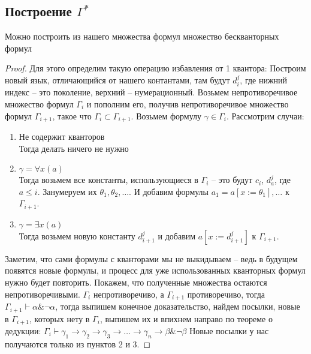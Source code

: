 \subsection{Построение \texorpdfstring{$\Gamma ^ *$}{Г*}}
\label{sec-8-5}
\begin{theorem}
Можно построить из нашего множества формул множество бескванторных формул
\end{theorem}
\begin{proof}
Для этого определим такую операцию избавления от 1 квантора: Построим новый язык, отличающийся от нашего контантами, там будут $d_i^j$, где нижний индекс -- это поколение, верхний – нумерационный. Возьмем непротиворечивое множество формул $\Gamma_i$ и пополним его, получив непротиворечивое множество формул $\Gamma_{i+1}$, такое что $\Gamma_i \subset \Gamma_{i+1}$. Возьмем формулу $\gamma \in \Gamma_{i}$. Рассмотрим случаи:
\begin{enumerate}
\item Не содержит кванторов\\
Тогда делать ничего не нужно
\item $\gamma = \forall x (a)$\\
Тогда возьмем все константы, использующиеся в $\Gamma_{i}$ -- это будут $c_i$, $d_a^j$, где $a \leq i$. Занумеруем их $\theta_1, \theta_2, \dots$. И добавим формулы $a_1=a[x:=\theta_1], \dots$ к $\Gamma_{i+1}$.
\item $\gamma = \exists x (a)$\\
Тогда возьмем новую константу $d_{i+1}^j$ и добавим $a[x:=d_{i+1}^j]$ к $\Gamma_{i+1}$.
\end{enumerate}

Заметим, что сами формулы с кванторами мы не выкидываем -- ведь в будущем появятся новые формулы, и процесс для уже использованных кванторных формул нужно будет повторить. Покажем, что полученные множества остаются непротиворечивыми. $\Gamma_i$ непротиворечиво, а $\Gamma_{i+1}$ противоречиво, тогда $\Gamma_{i+1} \vdash \alpha \& \neg \alpha$, тогда выпишем конечное доказательство, найдем посылки, новые в $\Gamma_{i+1}$, которых нету в $\Gamma_{i}$, выпишем их и впихнем направо по теореме о дедукции: $\Gamma_{i} \vdash \gamma_1 \to \gamma_2 \to \gamma_3 \to \dots \to \gamma_n \to \beta \& \neg \beta$ Новые посылки у нас получаются только из пунктов 2 и 3.


\end{proof}
